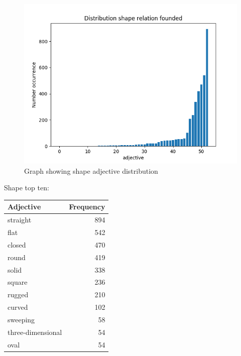 \documentclass[conference,compsoc]{IEEEtran}
\begin{document}
\begin{figure}[h]
\centering
\includegraphics[scale=0.52]{shape_plot}
\caption{ Graph showing shape adjective distribution}
\end{figure}


Shape top ten:
\begin{tabular}{lr}
\hline
 Adjective         &   Frequency \\
\hline
 straight          &         894 \\
 flat              &         542 \\
 closed            &         470 \\
 round             &         419 \\
 solid             &         338 \\
 square            &         236 \\
 rugged            &         210 \\
 curved            &         102 \\
 sweeping          &          58 \\
 three-dimensional &          54 \\
 oval              &          54 \\
\hline
\end{tabular}
\end{document}
